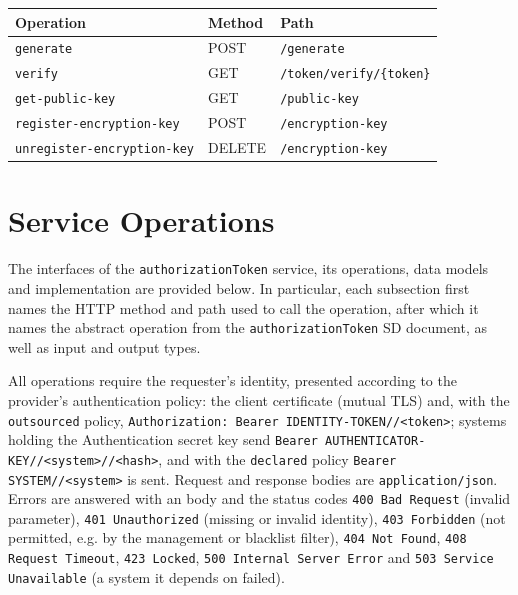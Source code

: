 \documentclass[a4paper]{arrowhead}
\newcommand{\mref}[2][]{{\textcolor{ArrowheadPurple}{\hyperref[sec:model:#2]{\ifstrempty{#1}{#2}{#1}}}}}
\begin{document}
\noindent\begin{longtable}{| p{5.2cm} | p{1.6cm} | p{8.4cm} |} \hline
\rowcolor{gray!33} Operation & Method & Path \\ \hline \endhead
\texttt{generate} & POST & \texttt{/\allowbreak{}generate} \\ \hline
\texttt{verify} & GET & \texttt{/\allowbreak{}token/\allowbreak{}verify/\allowbreak{}\{token\}} \\ \hline
\texttt{get-\allowbreak{}public-\allowbreak{}key} & GET & \texttt{/\allowbreak{}public-\allowbreak{}key} \\ \hline
\texttt{register-\allowbreak{}encryption-\allowbreak{}key} & POST & \texttt{/\allowbreak{}encryption-\allowbreak{}key} \\ \hline
\texttt{unregister-\allowbreak{}encryption-\allowbreak{}key} & DELETE & \texttt{/\allowbreak{}encryption-\allowbreak{}key} \\ \hline
\end{longtable}

\newpage

\section{Service Operations}
\label{sec:operations}

The interfaces of the \texttt{authorizationToken} service, its operations, data models and implementation are provided below.
In particular, each subsection first names the HTTP method and path used to call the operation, after which it names the abstract operation from the \texttt{authorizationToken} SD document, as well as input and output types.

All operations require the requester's identity, presented according to the provider's authentication policy: the client certificate (mutual TLS) and, with the \texttt{outsourced} policy, \texttt{Authorization: Bearer IDENTITY-TOKEN//<token>}; systems holding the Authentication secret key send \texttt{Bearer AUTHENTICATOR-KEY//<system>//<hash>}, and with the \texttt{declared} policy \texttt{Bearer SYSTEM//<system>} is sent. Request and response bodies are \texttt{application/json}.
Errors are answered with an \mref{ErrorMessage} body and the status codes \texttt{400 Bad Request} (invalid parameter), \texttt{401 Unauthorized} (missing or invalid identity), \texttt{403 Forbidden} (not permitted, e.g. by the management or blacklist filter), \texttt{404 Not Found}, \texttt{408 Request Timeout}, \texttt{423 Locked}, \texttt{500 Internal Server Error} and \texttt{503 Service Unavailable} (a system it depends on failed).
\end{document}
